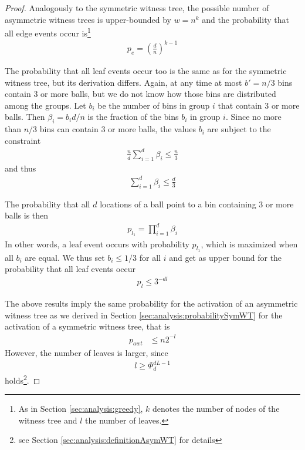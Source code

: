 \documentclass[a4paper,12pt]{article}
\begin{document}
\begin{proof}
Analogously to the symmetric witness tree, the possible number of asymmetric witness trees is upper-bounded by $w=n^k$ and the probability that all edge events occur is\footnote{As in Section \ref{sec:analysis:greedy}, $k$ denotes the number of nodes of the witness tree and $l$ the number of leaves.} 
\begin{align*}
p_e = \left(\frac{d}{n}\right)^{k-1}
\end{align*}

The probability that all leaf events occur too is the same as for the symmetric witness tree, but its derivation differs. Again, at any time at most $b'=n/3$ bins contain 3 or more balls, but we do not know how those bins are distributed among the groups. Let $b_i$ be the number of bins in group $i$ that contain 3 or more balls. Then $\beta_i = b_i d/ n$ is the fraction of the bins $b_i$ in group $i$. Since no more than $n/3$ bins can contain 3 or more balls, the values $b_i$ are subject to the constraint
\begin{align*}
\frac{n}{d}\sum_{i=1}^d \beta_i \leq \frac{n}{3}
\end{align*}
and thus 
\begin{align*}
\sum_{i=1}^d \beta_i \leq \frac{d}{3}
\end{align*}

The probability that all $d$ locations of a ball point to a bin containing 3 or more balls is then 
\begin{align*}
p_{l_1} = \prod_{i=1}^{d} \beta_i
\end{align*}
In other words, a leaf event occurs with probability $p_{l_1}$, which is maximized when all $b_i$ are equal. We thus set $b_i \leq 1/3$ for all $i$ and get as upper bound for the probability that all leaf events occur 
\begin{align*}
p_l \leq 3^{-d l}
\end{align*}

The above results imply the same probability for the activation of an asymmetric witness tree as we derived in Section \ref{sec:analysis:probabilitySymWT} for the activation of a symmetric witness tree, that is
\begin{align*}
p_{awt} &\leq n  2^{-l}
\end{align*}
However, the number of leaves is larger, since 
\begin{align*}
l \geq \Phi_d^{d L -1}
\end{align*}
holds\footnote{see Section \ref{sec:analysis:definitionAsymWT} for details}.


\end{proof}
\end{document}
